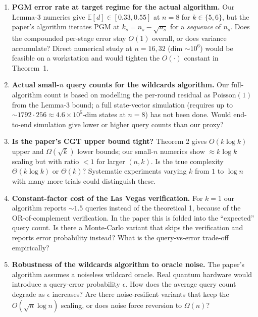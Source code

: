 \documentclass[11pt]{article}
\begin{document}
\begin{enumerate}
  \item[\textbf{Q1}] \textbf{PGM error rate at target regime for the actual algorithm.}
  Our Lemma-3 numerics give $\mathbb{E}[d]\in [0.33,0.55]$ at $n=8$ for
  $k\in\{5,6\}$, but the paper's algorithm iterates PGM at
  $k_s = n_s - \sqrt{n_s}$ for a \emph{sequence} of $n_s$. Does the
  compounded per-stage error stay $O(1)$ overall, or does variance
  accumulate? Direct numerical study at $n=16,32$ (dim $\sim 10^6$)
  would be feasible on a workstation and would tighten the $O(\cdot)$
  constant in Theorem~1.
  \item[\textbf{Q2}] \textbf{Actual small-$n$ query counts for the
  wildcards algorithm.} Our full-algorithm count is based on modelling
  the per-round residual as $\mathrm{Poisson}(1)$ from the Lemma-3
  bound; a full state-vector simulation (requires up to
  $\sim 1792\cdot 256\approx 4.6\times 10^5$-dim states at $n=8$) has not
  been done. Would end-to-end simulation give lower or higher query
  counts than our proxy?
  \item[\textbf{Q3}] \textbf{Is the paper's CGT upper bound tight?}
  Theorem 2 gives $O(k\log k)$ upper and $\Omega(\sqrt k)$ lower bounds;
  our small-$n$ numerics show $\approx k\log k$ scaling but with
  ratio $<1$ for larger $(n,k)$. Is the true complexity $\Theta(k\log k)$
  or $\Theta(k)$? Systematic experiments varying $k$ from $1$ to $\log n$
  with many more trials could distinguish these.
  \item[\textbf{Q4}] \textbf{Constant-factor cost of the Las Vegas
  verification.} For $k=1$ our algorithm reports $\sim 1.5$ queries
  instead of the theoretical 1, because of the OR-of-complement
  verification. In the paper this is folded into the ``expected'' query
  count. Is there a Monte-Carlo variant that skips the verification
  and reports error probability instead? What is the query-vs-error
  trade-off empirically?
  \item[\textbf{Q5}] \textbf{Robustness of the wildcards algorithm to
  oracle noise.} The paper's algorithm assumes a noiseless wildcard
  oracle. Real quantum hardware would introduce a query-error
  probability $\epsilon$. How does the average query count degrade as
  $\epsilon$ increases? Are there noise-resilient variants that keep
  the $O(\sqrt n\log n)$ scaling, or does noise force reversion to
  $\Omega(n)$?
\end{enumerate}
\end{document}
